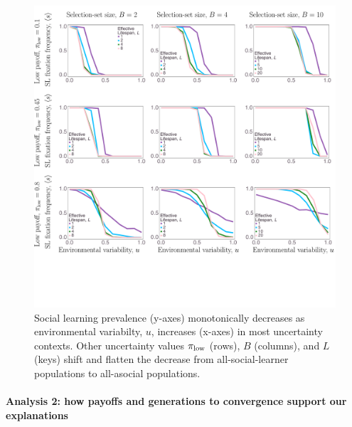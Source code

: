 \documentclass[letterpaper,11.5pt]{scrartcl}
\begin{document}
\begin{figure}
  \caption{Social learning prevalence (y-axes) monotonically decreases as 
  environmental variabilty, $u$, increases (x-axes) in most uncertainty contexts. 
  Other uncertainty values $\pi_{\mathrm{low}}$ (rows), $B$ (columns), and $L$ (keys)
  shift and flatten the decrease from all-social-learner populations to all-asocial 
  populations.}
  \label{fig:mainResults}
  \centering
    \includegraphics[width=\textwidth]{Figures/mainResultsPlots.pdf}
\end{figure}

\paragraph{Analysis 2: how payoffs and generations to convergence support our
explanations}
\end{document}
